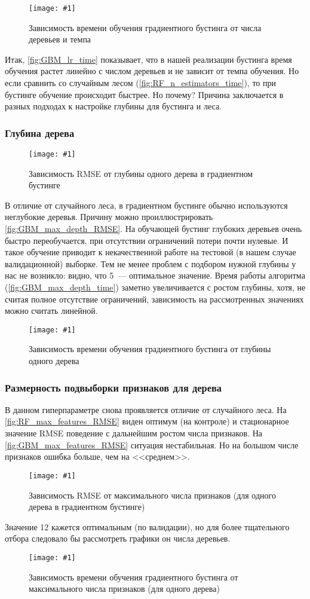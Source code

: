 \documentclass[12pt]{article}
\newcommand{\mpl}[2]{
    \begin{figure}[!h]
        \texttt{[image: \#1]}
        \centering
        \caption{#2}
        \label{fig:#1}
     \end{figure}
}
\begin{document}
\mpl{GBM_lr_time}{Зависимость времени обучения градиентного бустинга от числа деревьев и темпа}

Итак, \autoref{fig:GBM_lr_time} показывает, что в нашей реализации бустинга время обучения растет линейно с числом деревьев и не зависит от темпа обучения. Но если сравнить со случайным лесом (\autoref{fig:RF_n_estimators_time}), то при бустинге обучение происходит быстрее. Но почему? Причина заключается в разных подходах к настройке глубины для бустинга и леса.

\subsubsection{Глубина дерева}
\mpl{GBM_max_depth_RMSE}{Зависимость RMSE от глубины одного дерева в градиентном бустинге}
В отличие от случайного леса, в градиентном бустинге обычно используются неглубокие деревья. Причину можно проиллюстрировать \autoref{fig:GBM_max_depth_RMSE}. На обучающей бустинг глубоких деревьев очень быстро переобучается, при отсутствии ограничений потери почти нулевые. И такое обучение приводит к некачественной работе на тестовой (в нашем случае валидационной) выборке. Тем не менее проблем с подбором нужной глубины у нас не возникло: видно, что 5~--- оптимальное значение.
Время работы алгоритма (\autoref{fig:GBM_max_depth_time}) заметно увеличивается с ростом глубины, хотя, не считая полное отсутствие ограничений, зависимость на рассмотренных значениях можно считать линейной.
\mpl{GBM_max_depth_time}{Зависимость времени обучения градиентного бустинга от глубины одного дерева}

\subsubsection{Размерность подвыборки признаков для дерева}
В данном гиперпараметре снова проявляется отличие от случайного леса. На \autoref{fig:RF_max_features_RMSE} виден оптимум (на контроле) и стационарное значение RMSE поведение с дальнейшим ростом числа признаков. На \autoref{fig:GBM_max_features_RMSE} ситуация нестабильная. Но на большом числе признаков ошибка больше, чем на <<среднем>>. 
\mpl{GBM_max_features_RMSE}{Зависимость RMSE от максимального числа признаков (для одного дерева в градиентном бустинге)}
Значение 12 кажется оптимальным (по валидации), но для более тщательного отбора следовало бы рассмотреть графики он числа деревьев.
\mpl{GBM_max_features_time}{Зависимость времени обучения градиентного бустинга от максимального числа признаков (для одного дерева)}
\end{document}

